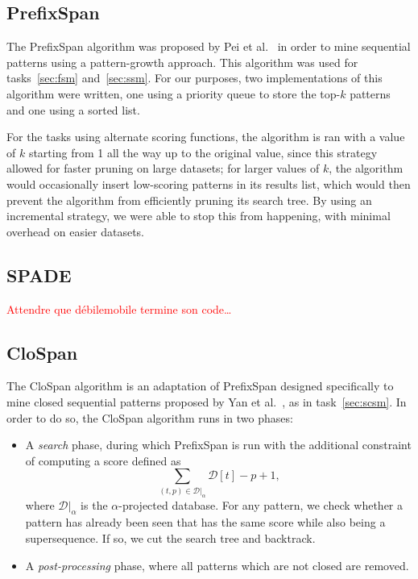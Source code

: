 \documentclass{sigkddExp}
\newcommand{\db}{\mathcal{D}}
\newcommand{\ps}{\textsf{PrefixSpan}}
\newcommand{\cs}{\textsf{CloSpan}}
\begin{document}
\subsection{PrefixSpan}
The \ps{} algorithm was proposed by Pei et al.~\cite{Pei2001, Pei2004} in order to mine sequential patterns using a pattern-growth approach.
This algorithm was used for tasks~\ref{sec:fsm} and~\ref{sec:ssm}.
For our purposes, two implementations of this algorithm were written, one using a priority queue to store the top-\(k\) patterns and one using a sorted list.

For the tasks using alternate scoring functions, the algorithm is ran with a value of \(k\) starting from 1 all the way up to the original value, since this strategy allowed for faster pruning on large datasets; for larger values of \(k\), the algorithm would occasionally insert low-scoring patterns in its results list, which would then prevent the algorithm from efficiently pruning its search tree.
By using an incremental strategy, we were able to stop this from happening, with minimal overhead on easier datasets.

\subsection{SPADE}
\textcolor{red}{Attendre que débilemobile termine son code\dots}

\subsection{CloSpan}
The \cs{} algorithm is an adaptation of \ps{} designed specifically to mine closed sequential patterns proposed by Yan et al.~\cite{Yan2003}, as in task~\ref{sec:scsm}.
In order to do so, the \cs{} algorithm runs in two phases:
\begin{itemize}
	\item A \emph{search} phase, during which \ps{} is run with the additional constraint of computing a score defined as
	\begin{equation}
	\sum_{(t, p) \in \db|_\alpha} \db[t] - p + 1,
	\end{equation}
	where \(\db|_\alpha\) is the \(\alpha\)-projected database.
	For any pattern, we check whether a pattern has already been seen that has the same score while also being a supersequence.
	If so, we cut the search tree and backtrack.
	\item A \emph{post-processing} phase, where all patterns which are not closed are removed.
\end{itemize}
\end{document}
